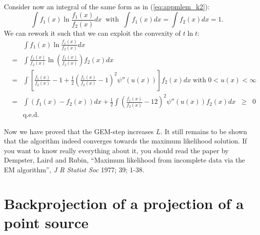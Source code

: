 Consider now an integral of the same form as in (\ref{eq:appmlem_k2}):
\begin{equation}
  \int f_1(x) \ln \frac{f_1(x)}{f_2(x)} dx \;\; \mbox{with} \;\;
  \int f_1(x) dx = \int f_2(x) dx = 1.
\end{equation}
We can rework it such that we can exploit the convexity of $t \ln t$:
\begin{eqnarray}
  & &  \int f_1(x) \ln \frac{f_1(x)}{f_2(x)} dx \nonumber\\
  & = & \int \frac{f_1(x)}{f_2(x)} \ln \left( \frac{f_1(x)}{f_2(x)} \right)
        f_2(x) dx \nonumber\\
  & = & \int \left[ \frac{f_1(x)}{f_2(x)} -1 + 
       \frac{1}{2}\left( \frac{f_1(x)}{f_2(x)} - 1\right)^2 
        \psi''(u(x)) \right]  f_2(x) dx \; \mbox{with} \; 0 < u(x) < \infty 
        \nonumber\\
  & = & \int \left( f_1(x) - f_2(x) \right) dx + 
        \frac{1}{2} \int \left( \frac{f_1(x)}{f_2(x)} - 1 2\right)^2
        \psi''(u(x)) f_2(x) dx \;\; \geq \;\; 0 \nonumber\\
  & & \mbox{q.e.d.} \nonumber
\end{eqnarray}

Now we have proved that the GEM-step increases $L$. It still remains
to be shown that the algorithm indeed converges towards the maximum
likelihood solution. If you want to know really everything about it, you
should read the paper by Dempster, Laird and Rubin, ``Maximum
likelihood from incomplete data via the EM algorithm'', {\em J R
Statist Soc} 1977; 39; 1-38.


\newpage
\section{Backprojection of a projection of a point source\label{app:bprojproj}}
